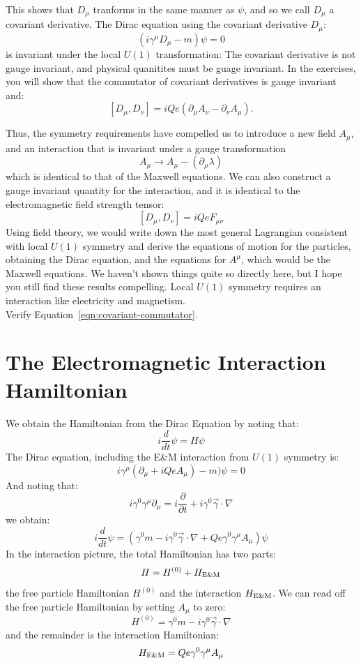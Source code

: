 \documentclass[12pt]{article}
\begin{document}
This shows that $D_\mu$ tranforms in the same manner as $\psi$, and so
we call $D_\mu$ a covariant derivative.
The Dirac equation using the covariant derivative $D_\mu$:
\begin{equation*}
  (i \gamma^\mu D_\mu - m ) \psi = 0
\end{equation*}
is invariant under the local $U(1)$ transformation:
The covariant derivative is not gauge invariant, and physical
quanitites must be guage invariant.  In the exercises, you will show
that the commutator of covariant derivatives is gauge invariant and:
\begin{equation}
\label{eqn:covariant-commutator}
[D_\mu, D_\nu] = i Q e (\partial_\mu A_\nu -\partial_\nu A_\mu).
\end{equation}
  
Thus, the symmetry requirements have compelled us to introduce a new
field $A_\mu$, and an interaction that is invariant under a gauge
transformation
$$A_\mu \to A_\mu - (\partial_\mu \lambda)$$
which is identical to that of the Maxwell equations.  
We can also construct a gauge invariant quantity for the interaction,
and it is identical to the electromagnetic field strength tensor:
$$[D_\mu, D_\nu] = i Q e F_{\mu\nu}$$
Using field theory, we would write down the most general
Lagrangian consistent with local $U(1)$ symmetry and derive the
equations of motion for the particles, obtaining the Dirac equation,
and the equations for $A^\mu$, which would be the Maxwell equations.  We
haven't shown things quite so directly here, but I hope you still find
these results compelling.  Local $U(1)$ symmetry requires an
interaction like electricity and magnetism.\\[5pt]

\exercise Verify Equation~\ref{eqn:covariant-commutator}.

\section{The Electromagnetic Interaction Hamiltonian}

We obtain the Hamiltonian from the Dirac Equation by noting that:
$$i \frac{d}{dt} \psi = H \psi$$
The Dirac equation, including the E\&M interaction from $U(1)$ symmetry is:
$$i \gamma^\mu ( \partial_\mu + i Qe A_\mu) - m) \psi = 0$$
And noting that:
$$i \gamma^0 \gamma^\mu \partial_\mu = i \frac{\partial}{\partial t} + i \gamma^0 \vec{\gamma} \cdot \nabla$$
we obtain:
$$i \frac{d}{dt} \psi = \left( \gamma^0 m - i \gamma^0 \vec{\gamma} \cdot \nabla + Q e \gamma^0 \gamma^\mu A_\mu \right) \psi$$
In the interaction picture, the total Hamiltonian has two parts:
$$H = H^{(0)} + H_{\rm E\&M}$$
the free particle Hamiltonian $H^{(0)}$ and the interaction $H_{\rm E\&M}$. We can read off the free particle Hamiltonian by setting $A_\mu$ to zero:
$$H^{(0)} = \gamma^0 m - i \gamma^0 \vec{\gamma} \cdot \nabla$$
and the remainder is the interaction Hamiltonian:
\begin{equation}
\label{eqn:hem}
H_{\rm E\&M} = Q e \gamma^0 \gamma^\mu A_\mu 
\end{equation}
\end{document}
